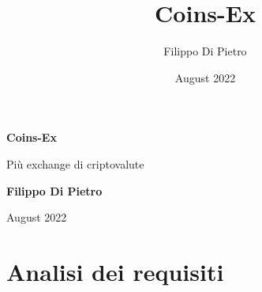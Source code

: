 \documentclass{article}
\title{Coins-Ex}
\author{Filippo Di Pietro}
\date{August 2022}
\begin{document}
\begin{titlepage}
    \begin{center}
        \vspace*{1cm}
            
        \Huge
        \textbf{Coins-Ex}
            
        \vspace{0.5cm}
        \LARGE
        Più exchange di criptovalute
            
        \vspace{1.5cm}
            
        \textbf{Filippo Di Pietro}
            
        \vfill
        August 2022
            
    \end{center}
\end{titlepage}
\newpage
\section{Analisi dei requisiti}
\end{document}
